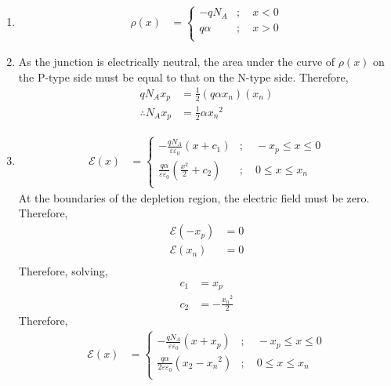 \documentclass[titlepage, fleqn, a4paper, 12pt, twoside]{article}
\theoremstyle{definition}
\theoremstyle{theorem}
\begin{document}
\begin{solution}
	\begin{enumerate}[leftmargin=*]
		\item
			\begin{align*}
				\rho(x) &=
					\begin{cases}
						-q N_A   & ;\quad x < 0 \\
						q \alpha & ;\quad x > 0 \\
					\end{cases}
			\end{align*}
		\item
			As the junction is electrically neutral, the area under the curve of $\rho(x)$ on the P-type side must be equal to that on the N-type side.
			Therefore,
			\begin{align*}
				q N_A x_p          & = \frac{1}{2} (q \alpha x_n) (x_n) \\
				\therefore N_A x_p & = \frac{1}{2} \alpha {x_n}^2
			\end{align*}
		\item
			\begin{align*}
				\mathcal{E}(x) &=
					\begin{cases}
						-\frac{q N_A}{\varepsilon \varepsilon_0} (x + c_1) &;\quad -x_p \le x \le 0\\
						\frac{q \alpha}{\varepsilon \varepsilon_0} \left( \frac{x^2}{2} + c_2 \right) &;\quad 0 \le x \le x_n\\
					\end{cases}
			\end{align*}
			At the boundaries of the depletion region, the electric field must be zero.
			Therefore,
			\begin{align*}
				\mathcal{E}(-x_p) & = 0 \\
				\mathcal{E}(x_n)  & = 0 \\
			\end{align*}
			Therefore, solving,
			\begin{align*}
				c_1 & = x_p \\
				c_2 & = -\frac{{x_n}^2}{2}
			\end{align*}
			Therefore,
			\begin{align*}
				\mathcal{E}(x) &=
					\begin{cases}
						-\frac{q N_A}{\varepsilon \varepsilon_0} (x + x_p)                        & ;\quad -x_p \le x \le 0 \\
						\frac{q \alpha}{2 \varepsilon \varepsilon_0} \left( x_2 - {x_n}^2 \right) & ;\quad 0 \le x \le x_n  \\

\end{cases}
\end{align*}
\end{enumerate}
\end{solution}
\end{document}
